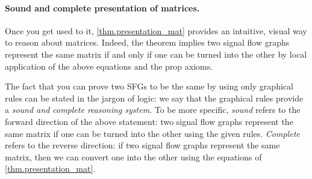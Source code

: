 \documentclass[7Sketches]{subfiles}
\begin{document}
\paragraph{Sound and complete presentation of matrices.}%
%

Once you get used to it, \cref{thm.presentation_mat} provides an intuitive,
visual way to reason about matrices. Indeed, the theorem implies two signal flow
graphs represent the same matrix if and only if one can be turned into the other
by local application of the above equations and the prop axioms.

The fact that you can prove two SFGs to be the same by using only graphical rules can be stated in the jargon
of logic: we say that the graphical rules provide a \emph{sound and complete reasoning system}. To be more
specific, \emph{sound} refers to the forward direction of the above statement:
two signal flow graphs represent the same matrix if one can be turned into the
other using the given rules.  \emph{Complete} refers to the reverse direction:
if two signal flow graphs represent the same matrix, then we can convert one into the other using the equations of \cref{thm.presentation_mat}.
\end{document}

